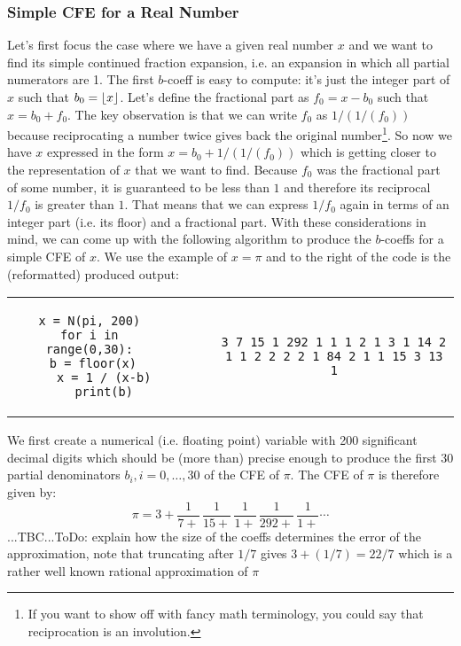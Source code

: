 \subsubsection{Simple CFE for a Real Number}
Let's first focus the case where we have a given real number $x$ and we want to find its simple continued fraction expansion, i.e. an expansion in which all partial numerators are 1. The first $b$-coeff is easy to compute: it's just the integer part of $x$ such that $b_0 = \lfloor x\rfloor$. Let's define the fractional part as $f_0 = x - b_0$ such that $x = b_0 + f_0$. The key observation is that we can write $f_0$ as $1/(1/(f_0))$ because reciprocating a number twice gives back the original number\footnote{If you want to show off with fancy math terminology, you could say that reciprocation is an involution.}. So now we have $x$ expressed in the form $x = b_0 + 1/(1/(f_0))$ which is getting closer to the representation of $x$ that we want to find. Because $f_0$ was the fractional part of some number, it is guaranteed to be less than $1$ and therefore its reciprocal $1/f_0$ is greater than $1$. That means that we can express $1/f_0$ again in terms of an integer part (i.e. its floor) and a fractional part. With these considerations in mind, we can come up with the following algorithm to produce the $b$-coeffs for a simple CFE of $x$. We use the example of $x = \pi$ and to the right of the code is the (reformatted) produced output:
\begin{center}
\begin{tabular}{ ccccc } 
\begin{lstlisting}
x = N(pi, 200)
for i in range(0,30):
    b = floor(x)   
    x = 1 / (x-b)
    print(b)
\end{lstlisting}
& & \vline & &
\begin{lstlisting}
3 7 15 1 292 1 1 1 2 1 3 1 14 2 
1 1 2 2 2 2 1 84 2 1 1 15 3 13 1
\end{lstlisting}
\end{tabular}
\end{center}
We first create a numerical (i.e. floating point) variable with 200 significant decimal digits which should be (more than) precise enough to produce the first 30 partial denominators $b_i, i = 0,\ldots,30$ of the CFE of $\pi$. The CFE of $\pi$ is therefore given by:
\begin{equation}
\pi = 3 + \frac{1}{7 +} \, \frac{1}{15+} \, \frac{1}{1 +} \, \frac{1}{292 +} \, \frac{1}{1 +} \cdots
\end{equation}
...TBC...ToDo: explain how the size of the coeffs determines the error of the approximation, note that truncating after $1/7$ gives $3 + (1/7) = 22/7$ which is a rather well known rational approximation of $\pi$

